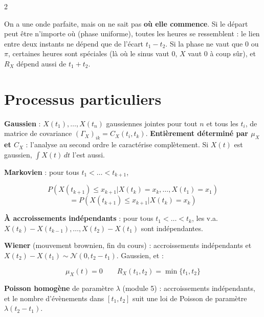 \documentclass[a4paper,9pt]{extarticle}
\begin{document}
\begin{multicols}{2}
\begin{example}
\end{example}


\begin{simple}

On a une onde parfaite, mais on ne sait pas \textbf{où elle commence}. Si le départ peut être
n'importe où (phase uniforme), toutes les heures se ressemblent : le lien entre deux instants
ne dépend que de l'écart $t_1 - t_2$. Si la phase ne vaut que 0 ou $\pi$, certaines heures
sont spéciales (là où le sinus vaut 0, $X$ vaut 0 à coup sûr), et $R_X$ dépend aussi de $t_1 +
t_2$.

\end{simple}


\section{Processus particuliers}


\begin{definition}

\textbf{Gaussien} : $X(t_1),\dots,X(t_n)$ gaussiennes jointes pour tout $n$ et tous les $t_i$,
de matrice de covariance $(\Gamma_X)_{ik} = C_X(t_i,t_k)$. \textbf{Entièrement déterminé par
$\mu_X$ et $C_X$} : l'analyse au second ordre le caractérise complètement. Si $X(t)$ est
gaussien, $\int X(t)\,dt$ l'est aussi.

\vspace{3pt}

\textbf{Markovien} : pour tous $t_1<\dots<t_{k+1}$,

\[
P(X(t_{k+1})\le x_{k+1} | X(t_k) = x_k,\dots,X(t_1) = x_1)
\]
\[
= P(X(t_{k+1})\le x_{k+1}|X(t_k) = x_k)
\]

\textbf{À accroissements indépendants} : pour tous $t_1<\dots<t_k$, les v.a. $X(t_k) -
X(t_{k-1}), \dots, X(t_2) - X(t_1)$ sont indépendantes.

\end{definition}


\begin{definition}

\textbf{Wiener} (mouvement brownien, fin du cours) : accroissements indépendants et $X(t_2) -
X(t_1)\sim\mathcal N(0, t_2-t_1)$. Gaussien, et :

\[
\mu_X(t) = 0 \qquad R_X(t_1,t_2) = \min\{t_1,t_2\}
\]

\textbf{Poisson homogène} de paramètre $\lambda$ (module 5) : accroissements indépendants, et
le nombre d'évènements dans $[t_1,t_2]$ suit une loi de Poisson de paramètre
$\lambda(t_2-t_1)$.


\end{definition}
\end{multicols}
\end{document}

